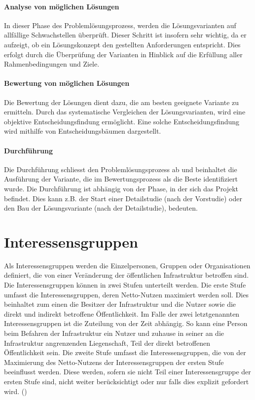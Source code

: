 \paragraph{Analyse von möglichen Lösungen} In dieser Phase des Problemlösungsprozess, werden die Lösungsvarianten auf allfällige Schwachstellen überprüft. Dieser Schritt ist insofern sehr wichtig, da er aufzeigt, ob ein Lösungskonzept den gestellten Anforderungen entspricht. Dies erfolgt durch die Überprüfung der Varianten in Hinblick auf die Erfüllung aller Rahmenbedingungen und Ziele. 

\paragraph{Bewertung von möglichen Lösungen} Die Bewertung der Lösungen dient dazu, die am besten geeignete Variante zu ermitteln. Durch das systematische Vergleichen der Lösungsvarianten, wird eine objektive Entscheidungsfindung ermöglicht. Eine solche Entscheidungsfindung wird mithilfe von Entscheidungsbäumen dargestellt. 

\paragraph{Durchführung} Die Durchführung schliesst den Problemlösungsprozess ab und beinhaltet die Ausführung der Variante, die im Bewertungsprozess als die Beste identifiziert wurde. Die Durchführung ist abhängig von der Phase, in der sich das Projekt befindet. Dies kann z.B. der Start einer Detailstudie (nach der Vorstudie) oder den Bau der Lösungsvariante (nach der Detailstudie), bedeuten.

\section{Interessensgruppen}
\label{sec:Inter.gruppen}

Als Interessensgruppen werden die Einzelpersonen, Gruppen oder Organisationen definiert, die von einer Veränderung der öffentlichen Infrastruktur betroffen sind. Die Interessensgruppen können in zwei Stufen unterteilt werden. Die erste Stufe umfasst die Interessensgruppen, deren Netto-Nutzen maximiert werden soll. Dies beinhaltet zum einen die Besitzer der Infrastruktur und die Nutzer sowie die direkt und indirekt betroffene Öffentlichkeit. Im Falle der zwei letztgenannten Interessensgruppen ist die Zuteilung von der Zeit abhängig. So kann eine Person beim Befahren der Infrastruktur ein Nutzer und zuhause in seiner an die Infrastruktur angrenzenden Liegenschaft, Teil der direkt betroffenen Öffentlichkeit sein. Die zweite Stufe umfasst die Interessensgruppen, die von der Maximierung des Netto-Nutzens der Interessensgruppen der ersten Stufe beeinflusst werden. Diese werden, sofern sie nicht Teil einer Interessensgruppe der ersten Stufe sind, nicht weiter berücksichtigt oder nur falls dies explizit gefordert wird. (\cite{Adeyetall2019})

